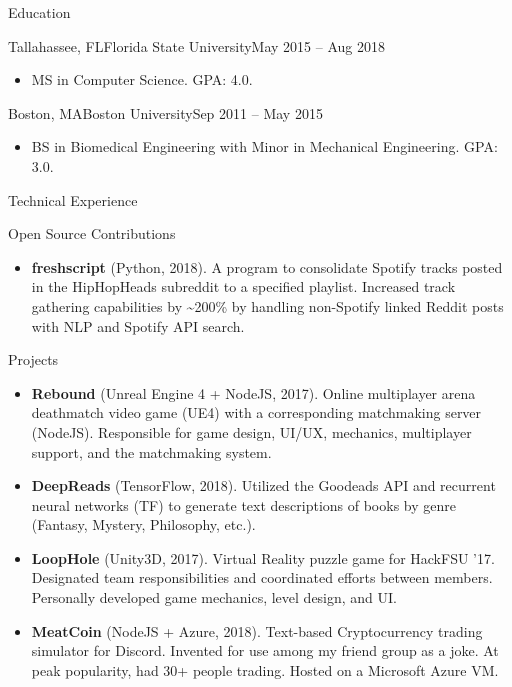 \documentclass[]{mcdowellcv}
\begin{document}
	\begin{cvsection}{Education}
		\begin{cvsubsection}{Tallahassee, FL}{Florida State University}{May 2015 -- Aug 2018}
			\begin{itemize}
				\item MS in Computer Science. GPA: 4.0.
			\end{itemize}
		\end{cvsubsection}
		
		\begin{cvsubsection}{Boston, MA}{Boston University}{Sep 2011 -- May 2015}
			\begin{itemize}
				\item BS in Biomedical Engineering with Minor in Mechanical Engineering. GPA: 3.0.
			\end{itemize}
		\end{cvsubsection}
	\end{cvsection}
	
	\begin{cvsection}{Technical Experience}
		\begin{cvsubsection} {Open Source Contributions}{}{}
			\begin{itemize}
				\item \textbf{fresh\textunderscore script} (Python, 2018). A program to consolidate Spotify tracks posted in the HipHopHeads subreddit to a specified playlist. Increased track gathering capabilities by \~{}200\% by handling non-Spotify linked Reddit posts with NLP and Spotify API search.
			\end{itemize}
		\end{cvsubsection}	
	
		\begin{cvsubsection}{Projects}{}{}
			\begin{itemize}				
				\item \textbf{Rebound} (Unreal Engine 4 + NodeJS, 2017). Online multiplayer arena deathmatch video game (UE4) with a corresponding matchmaking server (NodeJS). Responsible for game design, UI/UX, mechanics, multiplayer support, and the matchmaking system. 
				\item \textbf{DeepReads} (TensorFlow, 2018). Utilized the Goodeads API and recurrent neural networks (TF) to generate text descriptions of books by genre (Fantasy, Mystery, Philosophy, etc.).
				\item \textbf{LoopHole} (Unity3D, 2017). Virtual Reality puzzle game for HackFSU '17. Designated team responsibilities and coordinated efforts between members. Personally developed game mechanics, level design, and UI.
				\item \textbf{MeatCoin} (NodeJS + Azure, 2018). Text-based Cryptocurrency trading simulator for Discord. Invented for use among my friend group as a joke. At peak popularity, had 30+ people trading. Hosted on a Microsoft Azure VM.
			\end{itemize}
		\end{cvsubsection}
	\end{cvsection}
	
\end{document}
